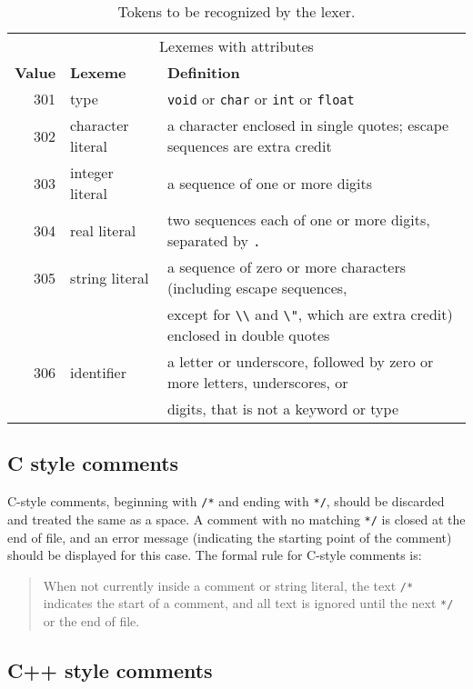 \documentclass{article}
\begin{document}
\begin{table}[t]
	\begin{tabular}{rll}
		\\
		\multicolumn{3}{c}{Lexemes with attributes}
		\\[1mm]
		{\bf Value} & {\bf Lexeme} & {\bf Definition}
	  \\ \hline
		301 & type & \verb|void| or \verb|char| or \verb|int| or \verb|float|
		\\
		302 & character literal & a character enclosed in single quotes;
			escape sequences are extra credit
		\\
		303 & integer literal & a sequence of one or more digits
		\\
		304 & real literal & two sequences each of one or more digits, separated by \verb|.|
		\\
		305 & string literal & a sequence of zero or more characters (including escape sequences,
		\\ & & except for \verb|\\| and \verb|\"|, which are extra credit) enclosed in double quotes
		\\
		306 & identifier & a letter or underscore, followed by zero or more letters,
			underscores, or
		\\ & & digits, that is not a keyword or type
	\end{tabular}

	\caption{Tokens to be recognized by the lexer.}
	\label{TAB:tokens}
\end{table}

\subsection{C style comments}

C-style comments, beginning with \verb|/*| and ending with \verb|*/|,
should be discarded and treated the same as a space.
A comment with no matching \verb|*/| is closed at the end of file,
and an error message
(indicating the starting point of the comment)
should be displayed for this case.
The formal rule for C-style comments is:
\begin{quote}
	When not currently inside a comment or string literal,
	the text \verb|/*| indicates the start of a comment,
	and all text is ignored until the next \verb|*/| or the end of file.
\end{quote}

\subsection{C++ style comments}
\end{document}
